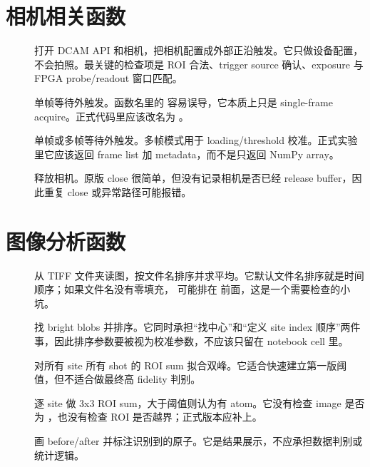 \documentclass[11pt,oneside,openany]{book}
\begin{document}
\section{相机相关函数}
\begin{description}
  \item[] 打开 DCAM API 和相机，把相机配置成外部正沿触发。它只做设备配置，不会拍照。最关键的检查项是 ROI 合法、trigger source 确认、exposure 与 FPGA probe/readout 窗口匹配。
  \item[] 单帧等待外触发。函数名里的  容易误导，它本质上只是 single-frame acquire。正式代码里应该改名为 。
  \item[] 单帧或多帧等待外触发。多帧模式用于 loading/threshold 校准。正式实验里它应该返回 frame list 加 metadata，而不是只返回 NumPy array。
  \item[] 释放相机。原版 close 很简单，但没有记录相机是否已经 release buffer，因此重复 close 或异常路径可能报错。
\end{description}

\section{图像分析函数}
\begin{description}
  \item[] 从 TIFF 文件夹读图，按文件名排序并求平均。它默认文件名排序就是时间顺序；如果文件名没有零填充， 可能排在  前面，这是一个需要检查的小坑。
  \item[] 找 bright blobs 并排序。它同时承担“找中心”和“定义 site index 顺序”两件事，因此排序参数要被视为校准参数，不应该只留在 notebook cell 里。
  \item[] 对所有 site 所有 shot 的 ROI sum 拟合双峰。它适合快速建立第一版阈值，但不适合做最终高 fidelity 判别。
  \item[] 逐 site 做 3x3 ROI sum，大于阈值则认为有 atom。它没有检查 image 是否为 ，也没有检查 ROI 是否越界；正式版本应补上。
  \item[] 画 before/after 并标注识别到的原子。它是结果展示，不应承担数据判别或统计逻辑。
\end{description}
\end{document}
